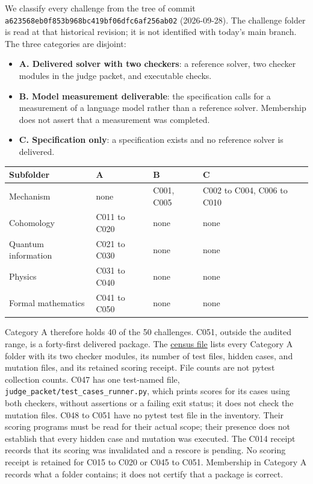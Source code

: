 \documentclass[
  11pt,
]{article}
\providecommand{\tightlist}{%
  \setlength{\itemsep}{0pt}\setlength{\parskip}{0pt}}
\begin{document}
We classify every challenge from the tree of commit
\nolinkurl{a623568eb0f853b968bc419bf06dfc6af256ab02} (2026-09-28). The
challenge folder is read at that historical revision; it is not
identified with today's main branch. The three categories are disjoint:

\begin{itemize}
\tightlist
\item
  \textbf{A. Delivered solver with two checkers}: a reference solver,
  two checker modules in the judge packet, and executable checks.
\item
  \textbf{B. Model measurement deliverable}: the specification calls for
  a measurement of a language model rather than a reference solver.
  Membership does not assert that a measurement was completed.
\item
  \textbf{C. Specification only}: a specification exists and no
  reference solver is delivered.
\end{itemize}

\begin{longtable}[]{@{}llll@{}}
\toprule\noalign{}
Subfolder & A & B & C \\
\midrule\noalign{}
\endhead
\bottomrule\noalign{}
\endlastfoot
Mechanism & none & C001, C005 & C002 to C004, C006 to C010 \\
Cohomology & C011 to C020 & none & none \\
Quantum information & C021 to C030 & none & none \\
Physics & C031 to C040 & none & none \\
Formal mathematics & C041 to C050 & none & none \\
\end{longtable}

Category A therefore holds 40 of the 50 challenges. C051, outside the
audited range, is a forty-first delivered package. The
\href{../../008_pfp_mssn_tower_challenges_and_retraction_benchmarks/docs/challenge_census.md}{census
file} lists every Category A folder with its two checker modules, its
number of test files, hidden cases, and mutation files, and its retained
scoring receipt. File counts are not pytest collection counts. C047 has
one test-named file, \nolinkurl{judge_packet/test_cases_runner.py},
which prints scores for its cases using both checkers, without
assertions or a failing exit status; it does not check the mutation
files. C048 to C051 have no pytest test file in the inventory. Their
scoring programs must be read for their actual scope; their presence
does not establish that every hidden case and mutation was executed. The
C014 receipt records that its scoring was invalidated and a rescore is
pending. No scoring receipt is retained for C015 to C020 or C045 to
C051. Membership in Category A records what a folder contains; it does
not certify that a package is correct.
\end{document}
